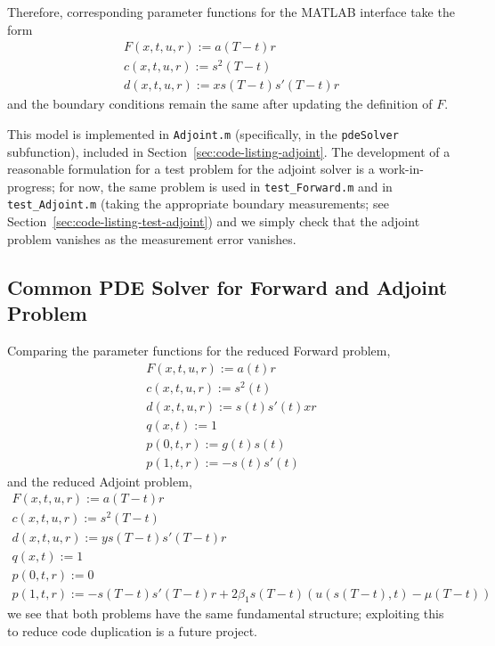 \documentclass[letterpaper, 10pt]{amsart}
\theoremstyle{definition}
\theoremstyle{remark}
\begin{document}
Therefore, corresponding parameter functions for the MATLAB interface take the form
\begin{gather*}
  F(x, t, u, r)
  := a(T-t) r
  \\
  c(x, t, u, r)
  := s^2(T-t)
  \\
  d(x, t, u, r)
  := x s(T-t) s'(T-t) r
\end{gather*}
and the boundary conditions remain the same after updating the definition of $F$.

This model is implemented in \verb+Adjoint.m+ (specifically, in the \verb+pdeSolver+ subfunction), included in Section~\ref{sec:code-listing-adjoint}.
The development of a reasonable formulation for a test problem for the adjoint solver is a work-in-progress; for now, the same problem is used in \verb+test_Forward.m+ and in \verb+test_Adjoint.m+ (taking the appropriate boundary measurements; see Section~\ref{sec:code-listing-test-adjoint}) and we simply check that the adjoint problem vanishes as the measurement error vanishes.

\subsection{Common PDE Solver for Forward and Adjoint Problem}
Comparing the parameter functions for the reduced Forward problem,
\begin{gather*}
  F(x, t, u, r) := a(t) r
  \\
  c(x, t, u, r) := s^2(t)
  \\
  d(x, t, u, r) := s(t) s'(t) x r
  \\
  q(x,t) :=1
  \\
  p(0, t, r) := g(t) s(t)
  \\
  p(1, t, r) := -s(t) s'(t)
\end{gather*}
and the reduced Adjoint problem,
\begin{gather*}
  F(x, t, u, r)
  := a(T-t) r
  \\
  c(x, t, u, r)
  := s^2(T-t)
  \\
  d(x, t, u, r)
  := y s(T-t) s'(T-t) r
  \\
  q(x,t) :=1
  \\
  p(0, t, r) := 0
  \\
  p(1, t, r) := -s(T-t) s'(T-t)r
  + 2 \beta_1 s(T-t) (u(s(T-t),t) - \mu(T-t))
\end{gather*}
we see that both problems have the same fundamental structure; exploiting this to reduce code duplication is a future project.
\end{document}
